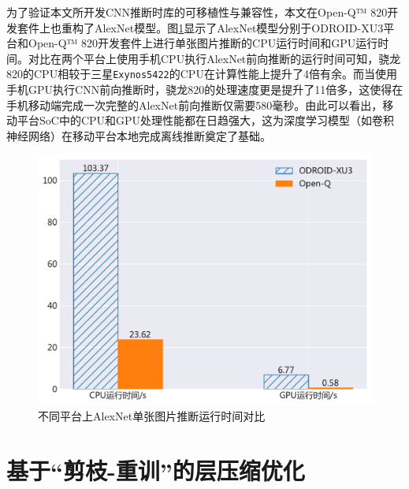 %

为了验证本文所开发CNN推断时库的可移植性与兼容性，本文在Open-Q™ 820开发套件上也重构了AlexNet模型。图\ref{figure:figure19}显示了AlexNet模型分别于ODROID-XU3平台和Open-Q™ 820开发套件上进行单张图片推断的CPU运行时间和GPU运行时间。对比在两个平台上使用手机CPU执行AlexNet前向推断的运行时间可知，骁龙820的CPU相较于三星\texttt{Exynos5422}的CPU在计算性能上提升了4倍有余。而当使用手机GPU执行CNN前向推断时，骁龙820的处理速度更是提升了11倍多，这使得在手机移动端完成一次完整的AlexNet前向推断仅需要580毫秒。由此可以看出，移动平台SoC中的CPU和GPU处理性能都在日趋强大，这为深度学习模型（如卷积神经网络）在移动平台本地完成离线推断奠定了基础。

\begin{figure}[htbp]
    \centering
    \includegraphics[height=0.4\textwidth]{figures/open_q.pdf}
    \caption{不同平台上AlexNet单张图片推断运行时间对比}\label{figure:figure19}
\end{figure}


\section{基于“剪枝-重训”的层压缩优化}

